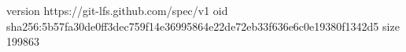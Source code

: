version https://git-lfs.github.com/spec/v1
oid sha256:5b57fa30de0ff3dec759f14e36995864e22de72eb33f636e6c0e19380f1342d5
size 199863
